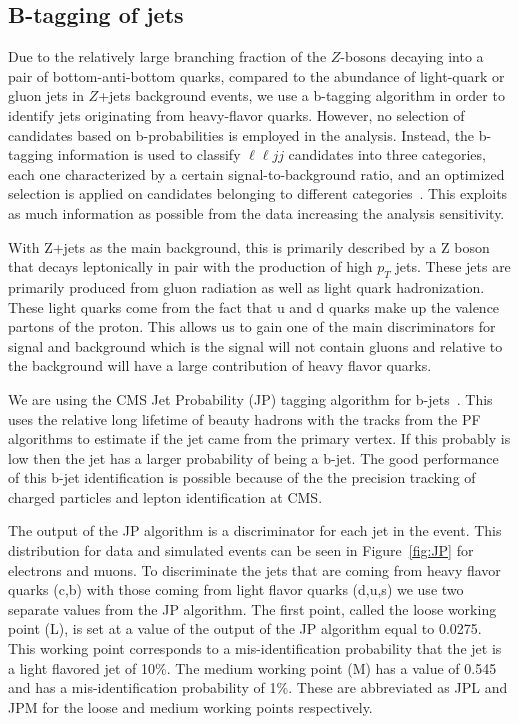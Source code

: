 \subsection{B-tagging of jets}
\label{subsec:btaggingofjets}
Due to the relatively large branching fraction of the $Z$-bosons decaying into a pair of bottom-anti-bottom quarks, compared to the abundance of light-quark or gluon jets in $Z$+jets background events, we use a b-tagging algorithm in order to identify jets originating from heavy-flavor quarks. However, no selection of candidates based on b-probabilities is employed in the analysis. Instead, the b-tagging information is used to classify $\ell \ell jj$ candidates into three categories, each one characterized by a certain signal-to-background ratio, and an optimized selection is applied on candidates belonging to different categories~\cite{CMS-AN-2011-399}. This exploits as much information as possible from the data increasing the analysis sensitivity.

With Z+jets as the main background, this is primarily described by a Z boson that decays leptonically in pair with the production of high $p_T$ jets. These jets are primarily produced from gluon radiation as well as light quark hadronization.  These light quarks come from the fact that u and d quarks make up the valence partons of the proton. This allows us to gain one of the main discriminators for signal and background which is the signal will not contain gluons and relative to the background will have a large contribution of heavy flavor quarks.

We are using the CMS Jet Probability (JP) tagging algorithm for b-jets~\cite{CMS-PAS-BTV-11-004}.  This uses the relative long lifetime of beauty hadrons with the tracks from the PF algorithms to estimate if the jet came from the primary vertex.  If this probably is low then the jet has a larger probability of being a b-jet.  The good performance of this b-jet identification is possible because of the the precision tracking of charged particles and lepton identification at CMS.

The output of the JP algorithm is a discriminator for each jet in the event.  This distribution for data and simulated events can be seen in Figure~\ref{fig:JP} for electrons and muons.  To discriminate the jets that are coming from heavy flavor quarks (c,b) with those coming from light flavor quarks (d,u,s) we use two separate values from the JP algorithm.  The first point, called the loose working point (L), is set at a value of the output of the JP algorithm equal to 0.0275. This working point corresponds to a mis-identification probability that the jet is a light flavored jet of 10\%.  The medium working point (M) has a value of 0.545 and has a mis-identification probability of 1\%.  These are abbreviated as JPL and JPM for the loose and medium working points respectively.


